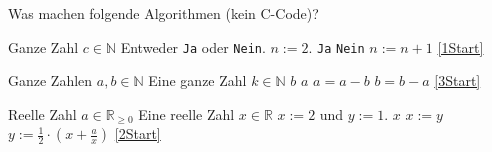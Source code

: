 \begin{aufg}
Was machen folgende Algorithmen (kein C-Code)?

\begin{algorithm}[H]
\caption{}
\begin{algorithmic}[1]
\REQUIRE Ganze Zahl $c\in\mathbb{N}$
\ENSURE Entweder \verb|Ja| oder \verb|Nein|.
\STATE \SET $n := 2$.
 \label{1Start}
\RETURN \verb|Ja|
\ENDIF
{}
\RETURN \verb|Nein|
\ENDIF
\STATE \SET $n := n + 1$
\STATE \GOTO \ref{1Start}
\end{algorithmic}
\end{algorithm}

\begin{algorithm}[H]
\caption{}
\begin{algorithmic}[1]
\REQUIRE Ganze Zahlen $a,b\in\mathbb{N}$
\ENSURE Eine ganze Zahl $k\in\mathbb{N}$
\RETURN $b$
\ENDIF
{} \label{3Start}
\RETURN $a$
\ENDIF
{}
\STATE \SET $a = a - b$
\ELSE 
\STATE \SET $b = b - a$
\ENDIF
\STATE \GOTO \ref{3Start}
\end{algorithmic}
\end{algorithm}

\begin{algorithm}[H]
\caption{}
\begin{algorithmic}[1]
\REQUIRE Reelle Zahl $a\in\mathbb{R}_{\ge 0}$
\ENSURE Eine reelle Zahl $x\in\mathbb{R}$
\STATE \SET $x := 2$ und $y := 1$.
 \label{2Start} 
\RETURN $x$
\ENDIF
\STATE \SET $x := y$
\STATE \SET $y := \frac{1}{2} \cdot \left(x+\frac{a}{x}\right)$
\STATE \GOTO \ref{2Start}
\end{algorithmic}
\end{algorithm}
\end{aufg}
